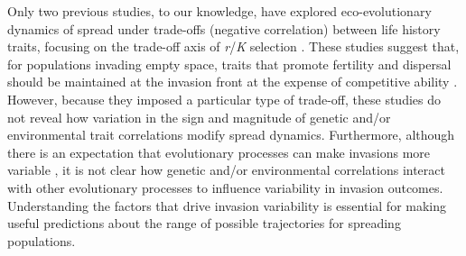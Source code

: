 \documentclass[11pt]{article}
\newcommand{\tom}[1]{{\textit{\color{WildStrawberry}{[#1]}}}}
\begin{document}
Only two previous studies, to our knowledge, have explored eco-evolutionary dynamics of spread under trade-offs (negative correlation) between life history traits, focusing on the trade-off axis of \textit{r}/\textit{K} selection \citep{burton_trade-offs_2010,perkins_after_2016}.
These studies suggest that, for populations invading empty space, traits that promote fertility and dispersal should be maintained at the invasion front at the expense of competitive ability \citep{burton_trade-offs_2010,perkins_after_2016}.
However, because they imposed a particular type of trade-off, these studies do not reveal how variation in the sign and magnitude of genetic and/or environmental trait correlations modify spread dynamics.
Furthermore, although there is an expectation that evolutionary processes can make invasions more variable \citep{phillips_evolutionary_2015,ochocki_rapid_2017,weiss-lehman_rapid_2017}, it is not clear how genetic and/or environmental correlations interact with other evolutionary processes to influence variability in invasion outcomes.
Understanding the factors that drive invasion variability is essential for making useful predictions about the range of possible trajectories for spreading populations.
\end{document}
